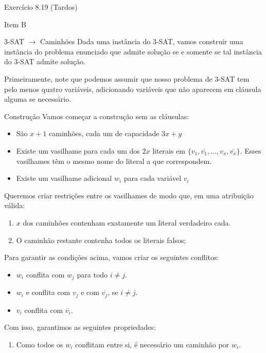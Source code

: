 \documentclass[presentation]{beamer}
\begin{document}
\begin{frame}[fragile,label=sec-6]{Exercício 8.19 (Tardos)}
\begin{block}{Item B}
\begin{block}{3-SAT $\to$ Caminhões}
Dada uma instância do 3-SAT, vamos construir uma instância do problema
enunciado que admite solução se e somente se tal
instância do 3-SAT admite solução.

Primeiramente, note que podemos assumir que nosso
problema de 3-SAT tem pelo menos quatro variáveis, adicionando
variáveis que não aparecem em cláusula alguma se necessário.

\begin{block}{Construção}
Vamos começar a construção sem as cláusulas:

\begin{itemize}
\item São $x+1$ caminhões, cada um de capacidade $3x+y$

\item Existe um vasilhame para cada um dos $2x$ literais em $\{v_1,
  \overline{v_1}, \ldots, v_x, \overline{v_x}\}$. Esses vasilhames têm o
mesmo nome do literal a que correspondem.

\item Existe um vasilhame adicional $w_i$ para cada variável $v_i$
\end{itemize}

Queremos criar restrições entre os vasilhames de modo que, em uma
atribuição válida:

\begin{enumerate}
\item $x$ dos caminhões contenham exatamente um literal verdadeiro cada.
\item O caminhão restante contenha todos os literais falsos;
\end{enumerate}

Para garantir as condições acima, vamos criar os seguintes conflitos:
\begin{itemize}
\item $w_i$ conflita com $w_j$ para todo $i \neq j$.
\item $w_i$ e conflita com $v_j$ e com $\overline{v_j}$, se $i \neq j$.
\item $v_i$ conflita com $\overline{v_i}$.
\end{itemize}

Com isso, garantimos as seguintes propriedades:

\begin{enumerate}[($P_1$)]
\item Como todos os $w_i$ conflitam entre si, é necessário um
caminhão por $w_i$.


\end{enumerate}
\end{block}
\end{block}
\end{block}
\end{frame}
\end{document}
